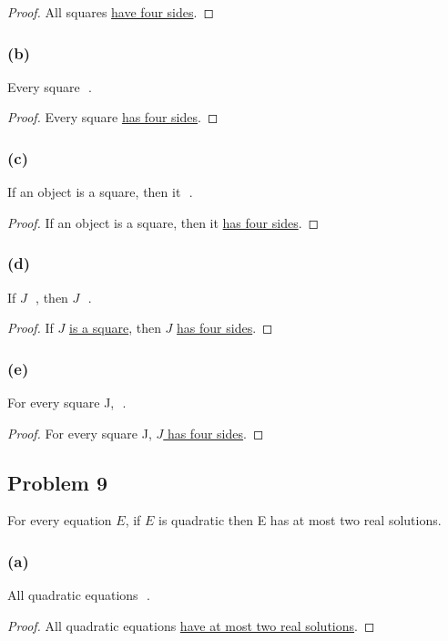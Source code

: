 \documentclass[14pt]{extarticle}
\newcommand{\fbl}{\underline{\hspace{1cm}}\,\,}
\begin{document}
\begin{proof}
    All squares \underline{have four sides}.
\end{proof}

\subsubsection{(b)}
Every square \fbl.

\begin{proof}
    Every square \underline{has four sides}.
\end{proof}

\subsubsection{(c)}
If an object is a square, then it \fbl.

\begin{proof}
    If an object is a square, then it \underline{has four sides}.
\end{proof}

\subsubsection{(d)}
If $J$ \fbl, then $J$ \fbl.

\begin{proof}
    If $J$ \underline{is a square}, then $J$ \underline{has four sides}.
\end{proof}

\subsubsection{(e)}
For every square J, \fbl.

\begin{proof}
    For every square J, \underline{$J$ has four sides}.
\end{proof}

\subsection{Problem 9}
For every equation $E$, if $E$ is quadratic then E has at most two real
solutions.

\subsubsection{(a)}
All quadratic equations \fbl.

\begin{proof}
    All quadratic equations \underline{have at most two real solutions}.
\end{proof}
\end{document}
